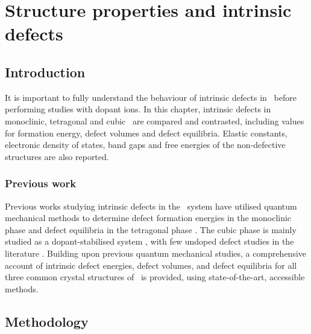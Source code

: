 \chapter{Structure properties and intrinsic defects} \label{ch:results1}  

\label{ch:defects}

\section{Introduction}  

It is important to fully understand the behaviour of intrinsic defects in \zirconia\ before performing studies with dopant ions. In this chapter, intrinsic defects in monoclinic, tetragonal and cubic \zirconia\ are compared and contrasted, including values for formation energy, defect volumes and defect equilibria. Elastic constants, electronic density of states, band gaps and free energies of the non-defective structures are also reported. %

\subsection{Previous work} 

Previous works studying intrinsic defects in the \zirconia\ system have utilised quantum mechanical methods to determine defect formation energies in the monoclinic phase \cite{zheng2007first,foster2002modelling,foster2001structure} and defect equilibria in the tetragonal phase \cite{youssef2012intrinsic}. The cubic phase is mainly studied as a dopant-stabilised system \cite{orera1990intrinsic,jiang2011first}, with few undoped defect studies in the literature \cite{mackrodt1986theoretical,aarhammar2009energetics}. Building upon previous quantum mechanical studies, a comprehensive account of intrinsic defect energies, defect volumes, and defect equilibria for all three common crystal structures of \zirconia\ is provided, using state-of-the-art, accessible methods.

\section{Methodology}
